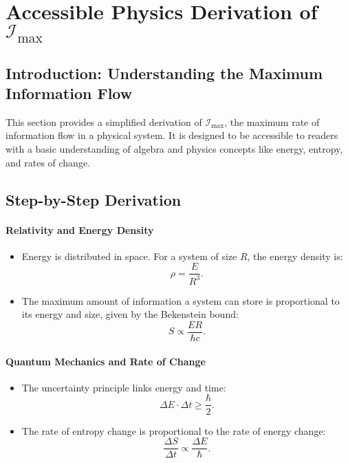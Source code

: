 \documentclass[12pt]{article}
\begin{document}
\section{Accessible Physics Derivation of \(\mathcal{I}_{\text{max}}\)}

\subsection{Introduction: Understanding the Maximum Information Flow}
This section provides a simplified derivation of \(\mathcal{I}_{\text{max}}\), the maximum rate of information flow in a physical system. It is designed to be accessible to readers with a basic understanding of algebra and physics concepts like energy, entropy, and rates of change.

\subsection{Step-by-Step Derivation}

\paragraph{Relativity and Energy Density}
\begin{itemize}
    \item Energy is distributed in space. For a system of size \(R\), the energy density is:
    \[
    \rho = \frac{E}{R^3}.
    \]
    \item The maximum amount of information a system can store is proportional to its energy and size, given by the Bekenstein bound:
    \[
    S \propto \frac{E R}{\hbar c}.
    \]
\end{itemize}

\paragraph{Quantum Mechanics and Rate of Change}
\begin{itemize}
    \item The uncertainty principle links energy and time:
    \[
    \Delta E \cdot \Delta t \geq \frac{\hbar}{2}.
    \]
    \item The rate of entropy change is proportional to the rate of energy change:
    \[
    \frac{\Delta S}{\Delta t} \propto \frac{\Delta E}{\hbar}.
    \]
\end{itemize}
\end{document}
